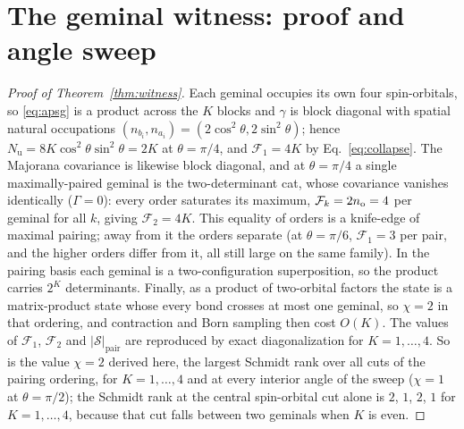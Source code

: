 
\section{The geminal witness: proof and angle sweep}
\label{app:witness}

\begin{proof}[Proof of Theorem~\ref{thm:witness}]
Each geminal occupies its own four spin-orbitals, so \eqref{eq:apsg} is a product across the $K$ blocks
and $\gamma$ is block diagonal with spatial natural occupations
$(n_{b_i},n_{a_i})=(2\cos^2\theta,2\sin^2\theta)$; hence $N_{\mathrm u}=8K\cos^2\theta\sin^2\theta=2K$ at
$\theta=\pi/4$, and $\mathcal F_1=4K$ by Eq.~\eqref{eq:collapse}. The Majorana covariance is likewise
block diagonal, and at $\theta=\pi/4$ a single maximally-paired geminal is the two-determinant cat, whose
covariance vanishes identically ($\Gamma=0$): every order saturates its maximum,
$\mathcal F_k=2n_{\rm o}=4$ per geminal for all $k$, giving $\mathcal F_2=4K$. This equality of orders is
a knife-edge of maximal pairing; away from it the orders separate (at $\theta=\pi/6$, $\mathcal F_1=3$ per pair, and the
higher orders differ from it, all still large on the same family). In the pairing basis
each geminal is a two-configuration superposition, so the product carries $2^{K}$ determinants. Finally,
as a product of two-orbital factors the state is a matrix-product state whose every bond crosses at most
one geminal, so $\chi=2$ in that ordering, and contraction and Born sampling then cost $O(K)$. The
values of $\mathcal F_1$, $\mathcal F_2$ and $|\mathcal S|_{\mathrm{pair}}$ are reproduced by exact
diagonalization for $K=1,\dots,4$. So is the value $\chi=2$ derived here, the largest Schmidt rank
over all cuts of the pairing ordering, for $K=1,\dots,4$ and at every interior angle of the sweep
($\chi=1$ at $\theta=\pi/2$); the Schmidt rank at the central spin-orbital cut alone is $2$, $1$, $2$,
$1$ for $K=1,\dots,4$, because that cut falls between two geminals when $K$ is even.
\end{proof}

%
%
